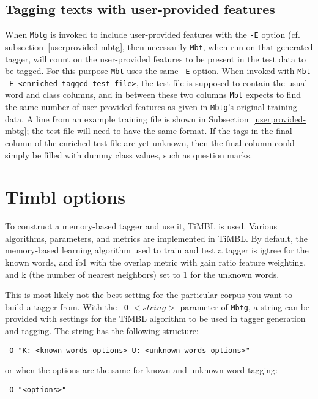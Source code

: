 \documentclass{report}
\begin{document}
\subsection{Tagging texts with user-provided features}
\label{userprovided-mbt}

When {\tt Mbtg} is invoked to include user-provided features with the
{\tt -E} option (cf. subsection~\ref{userprovided-mbtg}, then
necessarily {\tt Mbt}, when run on that generated tagger, will count
on the user-provided features to be present in the test data to be
tagged. For this purpose {\tt Mbt} uses the same {\tt -E} option. When
invoked with {\tt Mbt -E <enriched tagged test file>}, the test file
is supposed to contain the usual word and class columns, and in
between these two columns {\tt Mbt} expects to find the same number of
user-provided features as given in {\tt Mbtg}'s original training
data. A line from an example training file is shown in
Subsection~\ref{userprovided-mbtg}; the test file will need to have
the same format. If the tags in the final column of the enriched test
file are yet unknown, then the final column could simply be filled
with dummy class values, such as question marks.

\section{Timbl options}

To construct a memory-based tagger and use it, TiMBL is
used. Various algorithms, parameters, and metrics are implemented in
TiMBL. By default, the memory-based learning algorithm used to
train and test a tagger is {\sc igtree} for the known words, and {\sc
ib1} with the overlap metric with gain ratio feature weighting, and k
(the number of nearest neighbors) set to 1 for the unknown words.

This is most likely not the best setting for the particular corpus you
want to build a tagger from.  With the {\tt -O} $<string>$ parameter
of {\tt Mbtg}, a string can be provided with settings for the TiMBL
algorithm to be used in tagger generation and tagging. The string has
the following structure:

{\small
\begin{verbatim}
-O "K: <known words options> U: <unknown words options>" 
\end{verbatim}
}

or when the options are the same for known and unknown word tagging: 

{\small
\begin{verbatim}
-O "<options>"
\end{verbatim}
}
\end{document}
